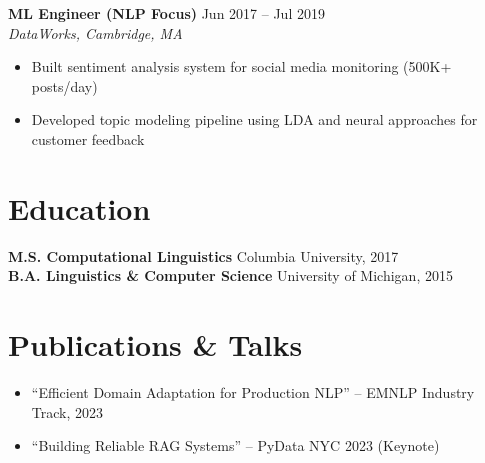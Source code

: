 \documentclass[11pt,a4paper]{article}
\begin{document}
\noindent\textbf{ML Engineer (NLP Focus)} \hfill \textcolor{accent}{Jun 2017 -- Jul 2019}\\
\textit{DataWorks, Cambridge, MA}
\begin{itemize}[leftmargin=1em,nosep,label={\color{accent}\footnotesize$\blacksquare$}]
\item Built sentiment analysis system for social media monitoring (500K+ posts/day)
\item Developed topic modeling pipeline using LDA and neural approaches for customer feedback
\end{itemize}

\section{Education}
\noindent\textbf{M.S. Computational Linguistics} \hfill Columbia University, 2017\\
\textbf{B.A. Linguistics \& Computer Science} \hfill University of Michigan, 2015

\section{Publications \& Talks}
\begin{itemize}[leftmargin=1em,nosep,label={\color{accent}\footnotesize$\blacksquare$}]
\item ``Efficient Domain Adaptation for Production NLP'' -- EMNLP Industry Track, 2023
\item ``Building Reliable RAG Systems'' -- PyData NYC 2023 (Keynote)
\end{itemize}
\end{document}
